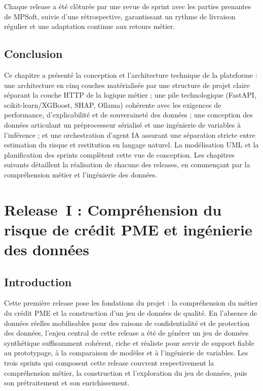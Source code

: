 \documentclass[a4paper,12pt,oneside]{report}
\begin{document}
Chaque release a été clôturée par une revue de sprint avec les parties prenantes de
MPSoft, suivie d'une rétrospective, garantissant un rythme de livraison régulier et
une adaptation continue aux retours métier.

\section*{Conclusion}

Ce chapitre a présenté la conception et l'architecture technique de la plateforme :
une architecture en cinq couches matérialisée par une structure de projet claire
séparant la couche HTTP de la logique métier ; une pile technologique (FastAPI,
scikit-learn/XGBoost, SHAP, Ollama) cohérente avec les exigences de performance,
d'explicabilité et de souveraineté des données ; une conception des données
articulant un préprocesseur sérialisé et une ingénierie de variables à l'inférence ;
et une orchestration d'agent IA assurant une séparation stricte entre estimation du
risque et restitution en langage naturel. La modélisation UML et la planification des
sprints complètent cette vue de conception. Les chapitres suivants détaillent la
réalisation de chacune des releases, en commençant par la compréhension métier et
l'ingénierie des données.

\chapter{Release~I : Compréhension du risque de crédit PME et ingénierie des données}

\section*{Introduction}

Cette première release pose les fondations du projet : la compréhension du métier du crédit
PME et la construction d'un jeu de données de qualité. En l'absence de données réelles
mobilisables pour des raisons de confidentialité et de protection des données, l'enjeu
central de cette release a été de générer un jeu de données synthétique suffisamment
cohérent, riche et réaliste pour servir de support fiable au prototypage, à la comparaison de
modèles et à l'ingénierie de variables. Les trois sprints qui composent cette release couvrent
respectivement la compréhension métier, la construction et l'exploration du jeu de données, puis
son prétraitement et son enrichissement.
\end{document}
